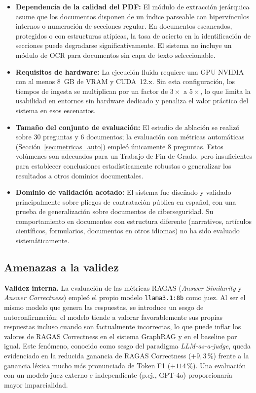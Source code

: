 \begin{itemize}
    \item \textbf{Dependencia de la calidad del PDF:} El módulo de extracción jerárquica asume que los documentos disponen de un índice parseable con hipervínculos internos o numeración de secciones regular. En documentos escaneados, protegidos o con estructuras atípicas, la tasa de acierto en la identificación de secciones puede degradarse significativamente. El sistema no incluye un módulo de OCR para documentos sin capa de texto seleccionable.

    \item \textbf{Requisitos de hardware:} La ejecución fluida requiere una GPU NVIDIA con al menos 8~GB de VRAM y CUDA~12.x. Sin esta configuración, los tiempos de ingesta se multiplican por un factor de $3\times$ a $5\times$, lo que limita la usabilidad en entornos sin hardware dedicado y penaliza el valor práctico del sistema en esos escenarios.

    \item \textbf{Tamaño del conjunto de evaluación:} El estudio de ablación se realizó sobre 30 preguntas y 6 documentos; la evaluación con métricas automáticas (Sección~\ref{sec:metricas_auto}) empleó únicamente 8 preguntas. Estos volúmenes son adecuados para un Trabajo de Fin de Grado, pero insuficientes para establecer conclusiones estadísticamente robustas o generalizar los resultados a otros dominios documentales.

    \item \textbf{Dominio de validación acotado:} El sistema fue diseñado y validado principalmente sobre pliegos de contratación pública en español, con una prueba de generalización sobre documentos de ciberseguridad. Su comportamiento en documentos con estructura diferente (narrativos, artículos científicos, formularios, documentos en otros idiomas) no ha sido evaluado sistemáticamente.
\end{itemize}

\subsection{Amenazas a la validez}

\textbf{Validez interna.} La evaluación de las métricas RAGAS (\textit{Answer Similarity} y \textit{Answer Correctness}) empleó el propio modelo \texttt{llama3.1:8b} como juez. Al ser el mismo modelo que genera las respuestas, se introduce un sesgo de autoconfirmación: el modelo tiende a valorar favorablemente sus propias respuestas incluso cuando son factualmente incorrectas, lo que puede inflar los valores de RAGAS Correctness en el sistema GraphRAG y en el baseline por igual. Este fenómeno, conocido como sesgo del paradigma \textit{LLM-as-a-judge}, queda evidenciado en la reducida ganancia de RAGAS Correctness ($+9{,}3$\,\%) frente a la ganancia léxica mucho más pronunciada de Token F1 ($+114$\,\%). Una evaluación con un modelo-juez externo e independiente (p.ej., GPT-4o) proporcionaría mayor imparcialidad.

